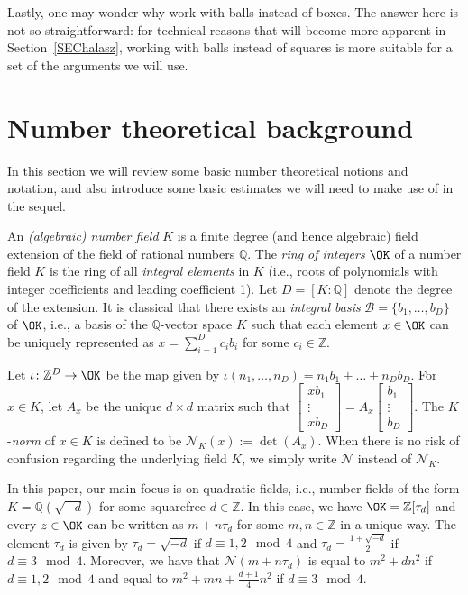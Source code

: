 \documentclass[11pt]{amsart}
\theoremstyle{definition}
\newcommand{\NN}{{\mathcal N}}
\newcommand{\Q}{{\mathbb Q}}
\newcommand{\Z}{{\mathbb Z}}
\begin{document}
Lastly, one may wonder why work with balls instead of boxes. The answer here is not so straightforward: for technical reasons that will become more apparent in Section~\ref{SEChalasz}, working with balls instead of squares is more suitable for a set of the arguments we will use.

\fi
\section{Number theoretical background}\label{SEC: numthybackg}
In this section we will review some basic number theoretical notions and notation, and also introduce some basic estimates we will need to make use of in the sequel.

An \emph{(algebraic) number field} $K$ is a finite degree (and hence algebraic) field extension of the field of rational numbers $\Q$. The \emph{ring of integers} $\OK$ of a number field $K$ is the ring of all \emph{integral elements} in $K$ (i.e., roots of polynomials with integer coefficients and leading coefficient 1). Let $D=[K:\Q]$ denote the degree of the extension. It is classical that there exists an \emph{integral basis} $\mathcal{B}=\{b_{1},\dots,b_{D}\}$ of $\OK$, i.e., a basis of the $\Q$-vector space $K$ such that each element $x\in\OK$ can be uniquely represented as $x=\sum_{i=1}^{D}c_{i}b_{i}$ for some $c_{i}\in\Z$.   

Let $\iota\colon\Z^{D}\to\OK$ be the map given by $\iota(n_{1},\dots,n_{D})=n_{1}b_{1}+\dots+n_{D}b_{D}$. For $x\in K$, let $A_{x}$ be the unique $d\times d$ matrix such that $\begin{bmatrix}
    xb_{1} \\ \vdots\\ xb_{D}
\end{bmatrix}=A_{x}\begin{bmatrix}
    b_{1} \\ \vdots\\ b_{D}
\end{bmatrix}$. The $K$-\emph{norm} of $x\in K$ is defined to be $\NN_{K}(x):=\det(A_{x})$. When there is no risk of confusion regarding the underlying field $K$, we simply write $\NN$ instead of $\NN_{K}$. 



In this paper, our main focus is on quadratic fields, i.e., number fields of the form $K=\Q(\sqrt{-d})$ for some squarefree $d\in\Z$. 
In this case, we have $\OK=\Z[\tau_{d}]$ and every $z\in\OK$ can be written as $m+n\tau_{d}$ for some $m,n\in\Z$ in a unique way. The element $\tau_d$ is given by $\tau_{d}=\sqrt{-d}$ if $d\equiv 1,2 \mod 4$ and $\tau_{d}=\frac{1+\sqrt{-d}}{2}$ if $d\equiv 3 \mod 4$. Moreover, we have that $\NN(m+n\tau_{d})$ is equal to $m^{2}+dn^{2}$ if $d\equiv 1,2 \mod 4$ and equal to $m^{2}+mn+\frac{d+1}{4}n^{2}$ if $d\equiv 3 \mod 4$.
\end{document}
